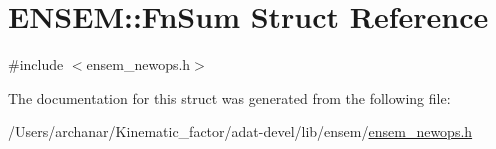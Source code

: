 \hypertarget{structENSEM_1_1FnSum}{}\section{E\+N\+S\+EM\+:\+:Fn\+Sum Struct Reference}
\label{structENSEM_1_1FnSum}


{\ttfamily \#include $<$ensem\+\_\+newops.\+h$>$}



The documentation for this struct was generated from the following file\+:\begin{DoxyCompactItemize}
\item 
/\+Users/archanar/\+Kinematic\+\_\+factor/adat-\/devel/lib/ensem/\mbox{\hyperlink{adat-devel_2lib_2ensem_2ensem__newops_8h}{ensem\+\_\+newops.\+h}}\end{DoxyCompactItemize}
